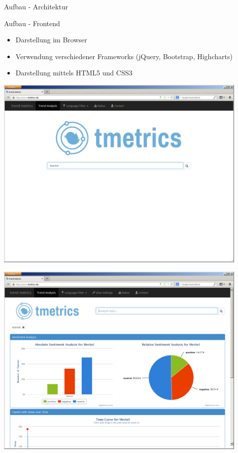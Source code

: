\begin{frame}{Aufbau - Architektur}

\end{frame}

\begin{frame}{Aufbau - Frontend}
    \begin{itemize}
        \item Darstellung im Browser 
        \item Verwendung verschiedener Frameworks (jQuery, Bootstrap, Highcharts)
        \item Darstellung mittels HTML5 und CSS3
    \end{itemize}
\end{frame}

\begin{frame}
    \includegraphics[width=0.926\textwidth]{../img/shots/01.png}
\end{frame}

\begin{frame}
    \includegraphics[width=0.926\textwidth]{../img/shots/02.png}
\end{frame}

